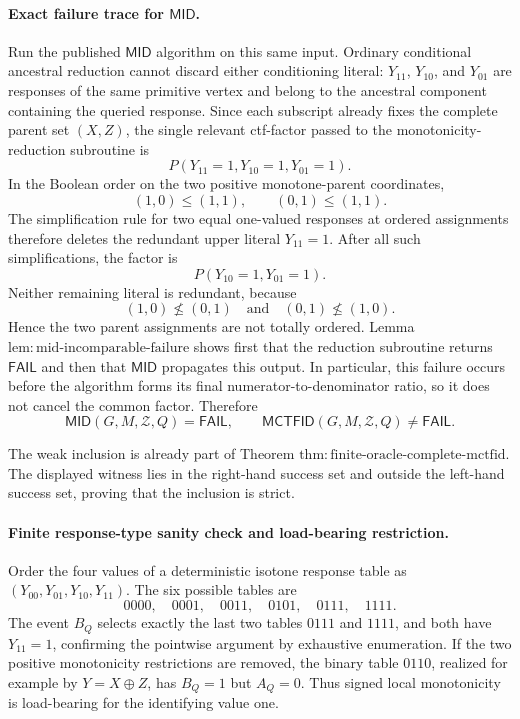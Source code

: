 \paragraph{Exact failure trace for \(\mathsf{MID}\).}
Run the published \(\mathsf{MID}\) algorithm on this same input.  Ordinary conditional ancestral reduction cannot discard either conditioning literal: \(Y_{11}\), \(Y_{10}\), and \(Y_{01}\) are responses of the same primitive vertex and belong to the ancestral component containing the queried response.  Since each subscript already fixes the complete parent set \((X,Z)\), the single relevant ctf-factor passed to the monotonicity-reduction subroutine is
\[
 P(Y_{11}=1,Y_{10}=1,Y_{01}=1).
\]
In the Boolean order on the two positive monotone-parent coordinates,
\[
 (1,0)\le(1,1),
 \qquad
 (0,1)\le(1,1).
\]
The simplification rule for two equal one-valued responses at ordered assignments therefore deletes the redundant upper literal \(Y_{11}=1\).  After all such simplifications, the factor is
\[
 P(Y_{10}=1,Y_{01}=1).
\]
Neither remaining literal is redundant, because
\[
 (1,0)\not\le(0,1)
 \quad\text{and}\quad
 (0,1)\not\le(1,0).
\]
Hence the two parent assignments are not totally ordered.  Lemma \(\mathrm{lem:mid\text{-}incomparable\text{-}failure}\) shows first that the reduction subroutine returns \(\mathsf{FAIL}\) and then that \(\mathsf{MID}\) propagates this output.  In particular, this failure occurs before the algorithm forms its final numerator-to-denominator ratio, so it does not cancel the common factor.  Therefore
\[
 \mathsf{MID}(G,M,\mathcal Z,Q)=\mathsf{FAIL},
 \qquad
 \mathsf{MCTFID}(G,M,\mathcal Z,Q)\ne\mathsf{FAIL}.
\]

The weak inclusion is already part of Theorem \(\mathrm{thm:finite\text{-}oracle\text{-}complete\text{-}mctfid}\).  The displayed witness lies in the right-hand success set and outside the left-hand success set, proving that the inclusion is strict.

\paragraph{Finite response-type sanity check and load-bearing restriction.}
Order the four values of a deterministic isotone response table as \((Y_{00},Y_{01},Y_{10},Y_{11})\).  The six possible tables are
\[
 0000,\quad 0001,\quad 0011,\quad 0101,\quad 0111,\quad 1111.
\]
The event \(B_Q\) selects exactly the last two tables \(0111\) and \(1111\), and both have \(Y_{11}=1\), confirming the pointwise argument by exhaustive enumeration.  If the two positive monotonicity restrictions are removed, the binary table \(0110\), realized for example by \(Y=X\mathbin{\oplus}Z\), has \(B_Q=1\) but \(A_Q=0\).  Thus signed local monotonicity is load-bearing for the identifying value one.